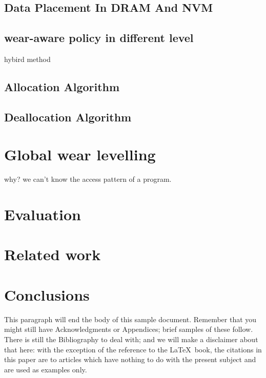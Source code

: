 \documentclass{vldb}
\begin{document}
\subsection{Data Placement In DRAM And NVM}


\subsection{wear-aware policy in different level}

hybird method




\subsection{Allocation Algorithm}

\subsection{Deallocation Algorithm}

\section{Global wear levelling}

why? we can’t know the access pattern of a program.

\section{Evaluation}

\section{Related work}


\section{Conclusions}
This paragraph will end the body of this sample document.
Remember that you might still have Acknowledgments or
Appendices; brief samples of these
follow.  There is still the Bibliography to deal with; and
we will make a disclaimer about that here: with the exception
of the reference to the \LaTeX\ book, the citations in
this paper are to articles which have nothing to
do with the present subject and are used as
examples only.
\end{document}
